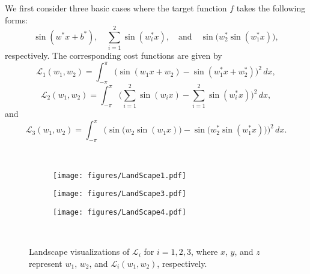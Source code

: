 \documentclass[11pt,a4paper]{article}
\begin{document}
We first consider three basic cases where the target function \( f \) takes the following forms: 
\[
\sin(w^* x + b^*), \quad \sum_{i=1}^2 \sin(w_i^* x), \quad \text{and} \quad \sin\big(w_2^* \sin(w_1^* x)\big),
\]
respectively. The corresponding cost functions are given by
\begin{equation*}
    \mathcal{L}_1(w_1, w_2) = \int_{-\pi}^{\pi} \Big(\sin(w_1x + w_2) - \sin(w_1^* x + w_2^*)\Big)^2 \, dx,
\end{equation*}
\begin{equation*}
    \mathcal{L}_2(w_1, w_2) = \int_{-\pi}^{\pi} \Bigg(\sum_{i=1}^2 \sin(w_i x) - \sum_{i=1}^2 \sin(w_i^* x)\Bigg)^2 \, dx,
\end{equation*}
and
\begin{equation*}
    \mathcal{L}_3(w_1, w_2) = \int_{-\pi}^{\pi} \Big(\sin\big(w_2 \sin(w_1 x)\big) - \sin\big(w_2^* \sin(w_1^* x)\big)\Big)^2 \, dx.
\end{equation*}
\begin{figure}[ht]%
            \centering

            \,\hfill
            \begin{subfigure}[b]{0.302245\textwidth}
                    \centering            
                    \texttt{[image: figures/LandScape1.pdf]}
                \end{subfigure}
                \hfill
            \begin{subfigure}[b]{0.302245\textwidth}
                    \centering            \texttt{[image: figures/LandScape3.pdf]}
                \end{subfigure}
            \hfill
            \begin{subfigure}[b]{0.302245\textwidth}
                    \centering            \texttt{[image: figures/LandScape4.pdf]}
                \end{subfigure}\hfill
                \,                
    \caption{
    Landscape visualizations of $\mathcal{L}_i$ for $i = 1,2,3$, where $x$, $y$, and $z$ represent $w_1$, $w_2$, and $\mathcal{L}_i(w_1,w_2)$, respectively.
}
\label{fig:landscape:three:base:cases}
\end{figure}
\end{document}
